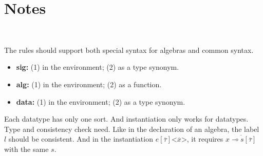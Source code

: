 \documentclass[a4paper]{article}
\begin{document}




\section{Notes}

~

The rules should support both special syntax for algebras and common syntax.
\begin{itemize}
\item \textbf{sig:} (1) in the environment; (2) as a type synonym.
\item \textbf{alg:} (1) in the environment; (2) as a function.
\item \textbf{data:} (1) in the environment; (2) as a type synonym.
\end{itemize}

Each datatype has only one sort. And instantiation only works for datatypes.\\

Type and consistency check need. Like in the declaration of an algebra, the label $l$ should be consistent. And in the instantiation $e[\overline{\tau}]\texttt{<}\overline{x}\texttt{>}$, it requires $\overline{x \multimap s[\overline{\tau}]}$ with the same $s$.
\end{document}

